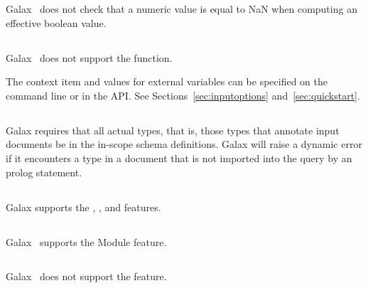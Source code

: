    Galax \galaxversion\ does not check that a numeric value is equal
   to NaN when computing an effective boolean value.

\subsection*{}

   Galax \galaxversion\ does not support the 
   function.
 
   The context item and values for external variables can be specified
   on the command line or in the API.  See
   Sections~\ref{sec:inputoptions} and~\ref{sec:quickstart}.

\subsection*{}

Galax requires that all actual types, that is, those types that annotate
input documents be in the in-scope schema definitions.   Galax
will raise a dynamic error if it encounters a type in a document that
is not imported into the query by an  prolog statement.

\subsection*{}

Galax supports the , , and
 features. 

\subsection*{}

   Galax \galaxversion\ supports the Module feature.

\subsection*{}

   Galax \galaxversion\ does not support the  feature.

